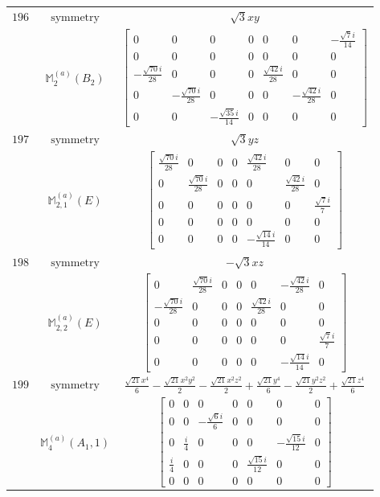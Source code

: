 \documentclass[fleqn,8pt,landscape]{jsarticle}
\begin{document}
\begin{longtable}{ccc}
$ 196 $ & $ \text{symmetry} $ & $ \sqrt{3} x y $ \\
$  $ & $ \mathbb{M}_{2}^{(a)}(B_{2}) $ & $ \begin{bmatrix} 0 & 0 & 0 & 0 & 0 & 0 & - \frac{\sqrt{7} i}{14} \\ 0 & 0 & 0 & 0 & 0 & 0 & 0 \\ - \frac{\sqrt{70} i}{28} & 0 & 0 & 0 & \frac{\sqrt{42} i}{28} & 0 & 0 \\ 0 & - \frac{\sqrt{70} i}{28} & 0 & 0 & 0 & - \frac{\sqrt{42} i}{28} & 0 \\ 0 & 0 & - \frac{\sqrt{35} i}{14} & 0 & 0 & 0 & 0 \end{bmatrix} $ \\ \hline
$ 197 $ & $ \text{symmetry} $ & $ \sqrt{3} y z $ \\
$  $ & $ \mathbb{M}_{2,1}^{(a)}(E) $ & $ \begin{bmatrix} \frac{\sqrt{70} i}{28} & 0 & 0 & 0 & \frac{\sqrt{42} i}{28} & 0 & 0 \\ 0 & \frac{\sqrt{70} i}{28} & 0 & 0 & 0 & \frac{\sqrt{42} i}{28} & 0 \\ 0 & 0 & 0 & 0 & 0 & 0 & \frac{\sqrt{7} i}{7} \\ 0 & 0 & 0 & 0 & 0 & 0 & 0 \\ 0 & 0 & 0 & 0 & - \frac{\sqrt{14} i}{14} & 0 & 0 \end{bmatrix} $ \\ \hline
$ 198 $ & $ \text{symmetry} $ & $ - \sqrt{3} x z $ \\
$  $ & $ \mathbb{M}_{2,2}^{(a)}(E) $ & $ \begin{bmatrix} 0 & \frac{\sqrt{70} i}{28} & 0 & 0 & 0 & - \frac{\sqrt{42} i}{28} & 0 \\ - \frac{\sqrt{70} i}{28} & 0 & 0 & 0 & \frac{\sqrt{42} i}{28} & 0 & 0 \\ 0 & 0 & 0 & 0 & 0 & 0 & 0 \\ 0 & 0 & 0 & 0 & 0 & 0 & \frac{\sqrt{7} i}{7} \\ 0 & 0 & 0 & 0 & 0 & - \frac{\sqrt{14} i}{14} & 0 \end{bmatrix} $ \\ \hline
$ 199 $ & $ \text{symmetry} $ & $ \frac{\sqrt{21} x^{4}}{6} - \frac{\sqrt{21} x^{2} y^{2}}{2} - \frac{\sqrt{21} x^{2} z^{2}}{2} + \frac{\sqrt{21} y^{4}}{6} - \frac{\sqrt{21} y^{2} z^{2}}{2} + \frac{\sqrt{21} z^{4}}{6} $ \\
$  $ & $ \mathbb{M}_{4}^{(a)}(A_{1},1) $ & $ \begin{bmatrix} 0 & 0 & 0 & 0 & 0 & 0 & 0 \\ 0 & 0 & - \frac{\sqrt{6} i}{6} & 0 & 0 & 0 & 0 \\ 0 & \frac{i}{4} & 0 & 0 & 0 & - \frac{\sqrt{15} i}{12} & 0 \\ \frac{i}{4} & 0 & 0 & 0 & \frac{\sqrt{15} i}{12} & 0 & 0 \\ 0 & 0 & 0 & 0 & 0 & 0 & 0 \end{bmatrix} $ \\ \hline

\end{longtable}
\end{document}

